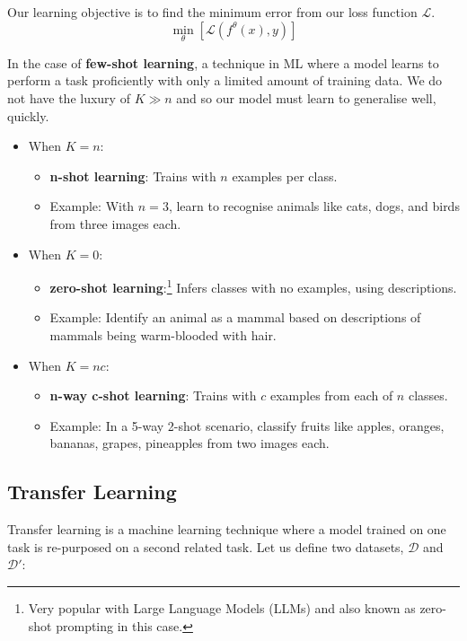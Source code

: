 Our learning objective is to find the minimum error from our loss function $\mathcal{L}$.
\begin{equation}
    \min_\theta \left[ \mathcal{L}(f^\theta(x),y) \right]
\end{equation}

In the case of \textbf{few-shot learning}, a technique in ML where a model learns to perform a task proficiently with only a limited amount of training data. We do not have the luxury of $K \gg n$ and so our model must learn to generalise well, quickly. 


\begin{itemize}[noitemsep]
    \item When $K = n$:
    \begin{itemize}[noitemsep]
        \item \textbf{n-shot learning}: Trains with $n$ examples per class.
        \item Example: With $n=3$, learn to recognise animals like cats, dogs, and birds from three images each.
    \end{itemize}
    \item When $K = 0$:
    \begin{itemize}[noitemsep]
        \item \textbf{zero-shot learning}:\footnote[][]{Very popular with Large Language Models (LLMs) and also known as zero-shot prompting in this case.} Infers classes with no examples, using descriptions.
        \item Example: Identify an animal as a mammal based on descriptions of mammals being warm-blooded with hair.
    \end{itemize}
    \item When $K = nc$:
    \begin{itemize}[noitemsep]
        \item \textbf{n-way c-shot learning}: Trains with $c$ examples from each of $n$ classes.
        \item Example: In a 5-way 2-shot scenario, classify fruits like apples, oranges, bananas, grapes, pineapples from two images each.
    \end{itemize}
\end{itemize}


\subsection{Transfer Learning}

Transfer learning is a machine learning technique where a model trained on one task is re-purposed on a second related task. Let us define two datasets, $\mathcal{D}$ and $\mathcal{D}'$:


